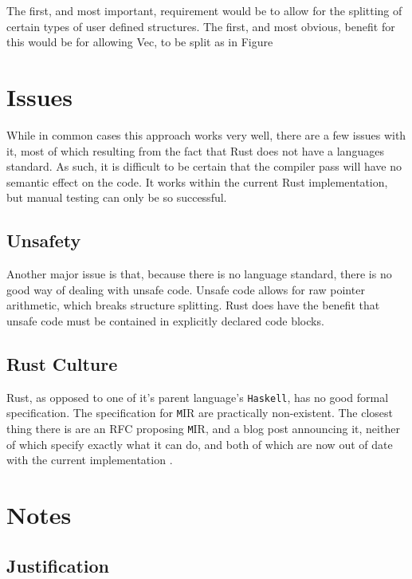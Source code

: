 \documentclass[12pt,final]{article}
\newcommand{\mirname}{{\texttt MIR}}
\def \mir {\mirname{}\xspace}
\begin{document}
The first, and most important, requirement would be to allow for the splitting
of certain types of user defined structures. The first, and most obvious,
benefit for this would be for allowing Vec, to be split as in Figure

\section{Issues}

While in common cases this approach works very well, there are a few issues with
it, most of which resulting from the fact that Rust does not have a languages
standard. As such, it is difficult to be certain that the compiler pass will
have no semantic effect on the code. It works within the current Rust
implementation, but manual testing can only be so successful.

\subsection{Unsafety}
\label{sec:unsafe}


Another major issue is that, because there is no language standard, there is no
good way of dealing with unsafe code. Unsafe code allows for raw pointer
arithmetic, which breaks structure splitting. Rust does have the benefit that
unsafe code must be contained in explicitly declared code blocks.

\subsection{Rust Culture}
\label{sec:culture}

Rust, as opposed to one of it's parent language's \texttt{Haskell}, has no good
formal specification. The specification for \mir are practically non-existent. %
The closest thing there is are an RFC proposing \mir, and a blog post announcing
it, neither of which specify exactly what it can do, and both of which are now
out of date with the current implementation .

\section{Notes}
\label{sec:remove}

\subsection{Justification}
\label{sec:just}
\end{document}
